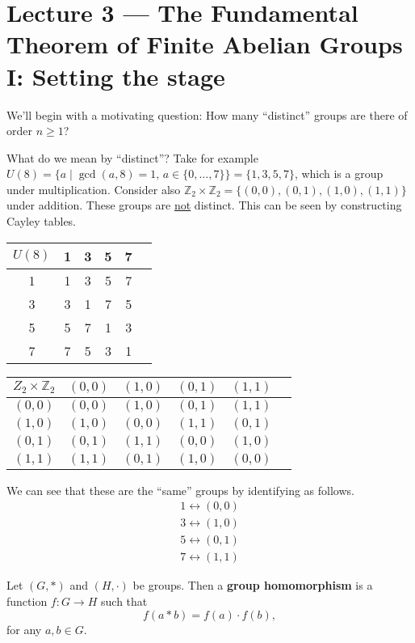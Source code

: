 \section{Lecture 3 — The Fundamental Theorem of Finite Abelian Groups I: Setting the stage}

We'll begin with a motivating question: How many ``distinct'' groups are there of order $n\geq 1$?

What do we mean by ``distinct''? Take for example $U(8)=\{a\mid\gcd(a,8)=1,\,a\in\{0,\hdots,7\}\}=\{1,3,5,7\}$, which is a group under multiplication. Consider also $\mathbb Z_2\times\mathbb Z_2=\{(0,0),(0,1),(1,0),(1,1)\}$ under addition. These groups are \underline{not} distinct. This can be seen by constructing Cayley tables.

\begin{center}
\begin{tabular}{c | c c c c c}
	$U(8)$ & 1 & 3 & 5 & 7\\ \hline
	1 & 1 & 3 & 5 & 7\\
	3 & 3 & 1 & 7 & 5\\
	5 & 5 & 7 & 1 & 3\\
	7 & 7 & 5 & 3 & 1
\end{tabular}\qquad\begin{tabular}{c | c c c c c}
	$Z_2\times\mathbb Z_2$ & $(0,0)$ & $(1,0)$ & $(0,1)$ & $(1,1)$\\ \hline
	$(0,0)$ & $(0,0)$ & $(1,0)$ & $(0,1)$ & $(1,1)$\\
	$(1,0)$ & $(1,0)$ & $(0,0)$ & $(1,1)$ & $(0,1)$\\
	$(0,1)$ & $(0,1)$ & $(1,1)$ & $(0,0)$ & $(1,0)$\\
	$(1,1)$ & $(1,1)$ & $(0,1)$ & $(1,0)$ & $(0,0)$
\end{tabular}
\end{center}

We can see that these are the ``same'' groups by identifying as follows.
\begin{gather*}
	1 \leftrightarrow (0,0)\\
	3 \leftrightarrow (1,0)\\
	5 \leftrightarrow (0,1)\\
	7 \leftrightarrow (1,1)
\end{gather*}

\begin{definition}
	Let $(G,*)$ and $(H,\cdot)$ be groups. Then a \textbf{group homomorphism} is a function $f\colon G\to H$ such that
	$$f(a*b)=f(a)\cdot f(b),$$
	for any $a,b\in G$.
\end{definition}

